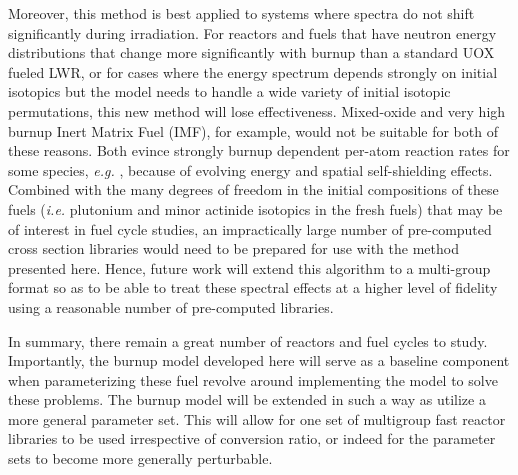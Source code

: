 Moreover, this method is best applied to systems where spectra do not shift significantly during 
irradiation.  For reactors and fuels that have neutron energy distributions that change more 
significantly with burnup than a standard UOX fueled LWR, or for cases where the energy spectrum 
depends strongly on initial isotopics but the model needs to handle a wide variety of initial 
isotopic permutations, this new method will lose effectiveness.  Mixed-oxide and very 
high burnup Inert Matrix Fuel (IMF), for example, would not be suitable for both of these reasons.  
Both evince strongly burnup dependent per-atom reaction rates for some species, 
\emph{e.g.} , because of evolving energy and spatial self-shielding effects.  
Combined with the many degrees of freedom in the initial compositions of these fuels 
(\emph{i.e.} plutonium and minor actinide isotopics in the fresh fuels) that may be of interest 
in fuel cycle studies, an impractically large number of pre-computed cross section libraries 
would need to be prepared for use with the method presented here.  Hence, future work will extend 
this algorithm to a multi-group format so as to be able to treat these spectral effects at a higher 
level of fidelity using a reasonable number of pre-computed libraries.

In summary, there remain a great number of reactors and fuel cycles to study.  Importantly, the 
burnup model developed here will serve as a baseline component when parameterizing these fuel 
revolve around implementing the model to solve these problems.  The burnup model will 
be extended in such a way as utilize a more general parameter set.  This will allow for one 
set of multigroup fast reactor libraries to be used irrespective of conversion ratio, or 
indeed for the parameter sets to become more generally perturbable.
